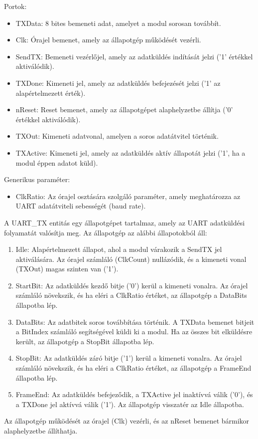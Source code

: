 \documentclass[a4paper,12pt,oneside]{book}
\begin{document}
Portok:
\begin{itemize}
	\item TXData: 8 bites bemeneti adat, amelyet a modul sorosan továbbít.
	\item Clk: Órajel bemenet, amely az állapotgép működését vezérli.
	\item SendTX: Bemeneti vezérlőjel, amely az adatküldés indítását jelzi ('1' értékkel aktiválódik).
	\item TXDone: Kimeneti jel, amely az adatküldés befejezését jelzi ('1' az alapértelmezett érték).
	\item nReset: Reset bemenet, amely az állapotgépet alaphelyzetbe állítja ('0' értékkel aktiválódik).
	\item TXOut: Kimeneti adatvonal, amelyen a soros adatátvitel történik.
	\item TXActive: Kimeneti jel, amely az adatküldés aktív állapotát jelzi ('1', ha a modul éppen adatot küld).
\end{itemize}
Generikus paraméter:
\begin{itemize}
	\item ClkRatio: Az órajel osztására szolgáló paraméter, amely meghatározza az UART adatátviteli sebességét (baud rate).
\end{itemize}
A UART\_TX entitás egy állapotgépet tartalmaz, amely az UART adatküldési folyamatát valósítja meg. Az állapotgép az alábbi állapotokból áll:
\begin{enumerate}
	\item Idle: Alapértelmezett állapot, ahol a modul várakozik a SendTX jel aktiválására. Az órajel számláló (ClkCount) nullázódik, és a kimeneti vonal (TXOut) magas szinten van ('1').
	\item StartBit: Az adatküldés kezdő bitje ('0') kerül a kimeneti vonalra. Az órajel számláló növekszik, és ha eléri a ClkRatio értéket, az állapotgép a DataBits állapotba lép.
	\item DataBits: Az adatbitek soros továbbítása történik. A TXData bemenet bitjeit a BitIndex számláló segítségével küldi ki a modul. Ha az összes bit elküldésre került, az állapotgép a StopBit állapotba lép.
	\item StopBit: Az adatküldés záró bitje ('1') kerül a kimeneti vonalra. Az órajel számláló növekszik, és ha eléri a ClkRatio értéket, az állapotgép a FrameEnd állapotba lép.
	\item FrameEnd: Az adatküldés befejeződik, a TXActive jel inaktívvá válik ('0'), és a TXDone jel aktívvá válik ('1'). Az állapotgép visszatér az Idle állapotba.
\end{enumerate}
Az állapotgép működését az órajel (Clk) vezérli, és az nReset bemenet bármikor alaphelyzetbe állíthatja.
\end{document}
